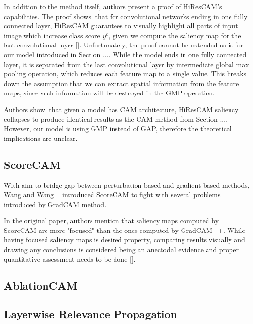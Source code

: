 In addition to the method itself, authors present a proof of HiResCAM's capabilities. The proof shows, that for convolutional networks ending in one fully connected layer, HiResCAM guarantees to visually highlight all parts of input image which increase class score $y^c$, given we compute the saliency map for the last convolutional layer []. Unfortunately, the proof cannot be extended as is for our model introduced in Section .... While the model ends in one fully connected layer, it is separated from the last convolutional layer by intermediate global max pooling operation, which reduces each feature map to a single value. This breaks down the assumption that we can extract spatial information from the feature maps, since such information will be destroyed in the GMP operation. 

Authors show, that given a model has CAM architecture, HiResCAM saliency collapses to produce identical results as the CAM method from Section .... However, our model is using GMP instead of GAP, therefore the theoretical implications are unclear.

\subsection{ScoreCAM}

With aim to bridge gap between perturbation-based and gradient-based methods, Wang and Wang [] introduced ScoreCAM to fight with several problems introduced by GradCAM method. 

In the original paper, authors mention that saliency maps computed by ScoreCAM are more "focused" than the ones computed by GradCAM++. While having focused saliency maps is desired property, comparing results visually and drawing any conclusions is considered being an anectodal evidence and proper quantitative assessment needs to be done [].


\subsection{AblationCAM}



\subsection{Layerwise Relevance Propagation}